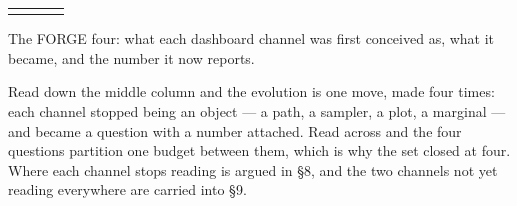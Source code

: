 \documentclass[11pt]{article}
\begin{document}
\begin{widetable}
\begin{tabularx}{\linewidth}{|N{0.34}|W{1.06}|W{1.30}|W{1.30}|}
& 
& 
&  \\ \hline

& 
& 
&  \\ \hline
\end{tabularx}
\caption{The FORGE four: what each dashboard channel was first conceived as,
what it became, and the number it now reports.}
\label{tab:forge-four}
\end{widetable}

Read down the middle column and the evolution is one move, made four times: each
channel stopped being an object --- a path, a sampler, a plot, a marginal --- and
became a question with a number attached. Read across and the four questions
partition one budget between them, which is why the set closed at four. Where
each channel stops reading is argued in \S8, and the two channels not yet
reading everywhere are carried into \S9.

\end{document}
